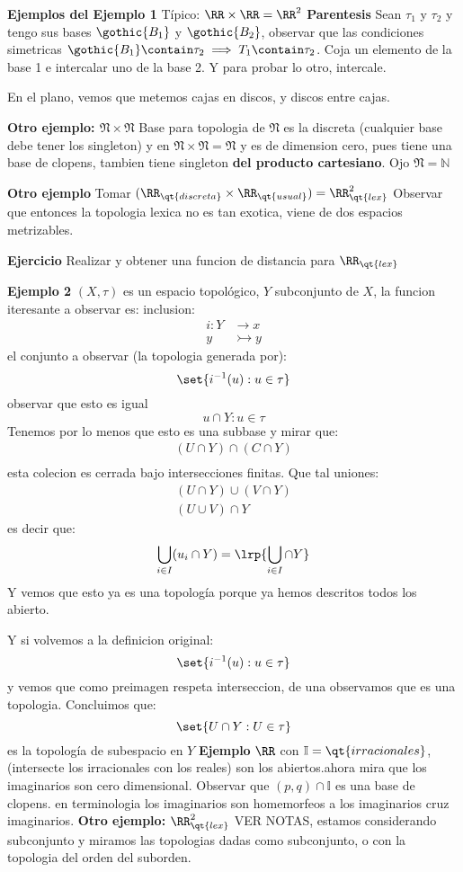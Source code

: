 \textbf{Ejemplos del Ejemplo 1}
Típico: $ \RR \times \RR  = \RR^2 $
\textbf{Parentesis }
Sean $ \tau_1 $ y $\tau_2 $ y tengo sus bases $ \gothic{B_1} $ y $\gothic{B_2} $, observar que las condiciones simetricas $ \gothic{B_1} \contain \tau_2 \implies T_1 \contain \tau_2$. 
Coja un elemento de la base 1 e intercalar uno de la base 2. Y para probar lo otro, intercale.

En el plano, vemos que metemos cajas en discos, y discos entre cajas.

\textbf{Otro ejemplo: $ \mathfrak{N} \times \mathfrak{N} $}
Base para topologia de $ \mathfrak{N} $ es la discreta (cualquier base debe tener los singleton) y en $ \mathfrak{N} \times \mathfrak{N} = \mathfrak{N} $ y es de dimension cero, pues tiene una base de clopens, tambien tiene singleton \textbf{del producto cartesiano}.
Ojo $ \mathfrak{N} = \mathbb{N} $
 
\textbf{Otro ejemplo} Tomar $ (\RR_{\qt{discreta}} \times \RR_{\qt{usual}}) = \RR_{\qt{lex}}^2 $ Observar que entonces la topologia lexica no es tan exotica, viene de dos espacios metrizables.

\textbf{Ejercicio} Realizar y obtener una funcion de distancia para $\RR_{\qt{lex}} $

\textbf{Ejemplo 2} $(X, \tau)$ es un espacio topológico, $Y$ subconjunto de $X$, la funcion iteresante a observar es: inclusion:
\begin{align*}
i: Y &\rightarrow x \\
y&\rightarrowtail y
\end{align*}
el conjunto a observar (la topologia generada por):
\[ \set{i^{-1}(u) : u \in \tau} \]
observar que esto es igual
\[ u \cap Y : u \in \tau \]
Tenemos por lo menos que esto es una subbase y mirar que:
\begin{align*}
(U \cap Y) \cap (C \cap Y) \\
\end{align*}
esta colecion es cerrada bajo intersecciones finitas.
Que tal uniones:
\begin{align*}
( U \cap Y) \cup  (V \cap Y)\\
(U \cup V) \cap Y
\end{align*}
es decir que:
\[ \bigcup_{i \in I} (u_i \cap Y) = \lrp{ \bigcup_{i \in I} \cap Y} \]
Y vemos que esto ya es una topología porque ya hemos descritos todos los abierto.

Y si volvemos a la definicion original:
\[ \set{i^{-1}(u): u \in \tau} \]
y vemos que como preimagen respeta interseccion, de una observamos que es una topologia.
Concluimos que:
\[ \set{U \cap Y : U \in \tau} \]
es la topología de subespacio en $Y$ 
\textbf{Ejemplo}
$\RR$ con $ \mathbb{I} = \qt{irracionales} $, (intersecte los irracionales con los reales) son los abiertos.ahora mira que los imaginarios son cero dimensional. Observar que $ (p,q) \cap \mathbb{I} $ es una base de clopens. en terminologia los imaginarios son homemorfeos a los imaginarios cruz imaginarios. 
\textbf{Otro ejemplo: $ \RR_{\qt{lex}}^2 $ }
VER NOTAS, estamos considerando subconjunto y miramos las topologias dadas como subconjunto, o con la topologia del orden del suborden. 

